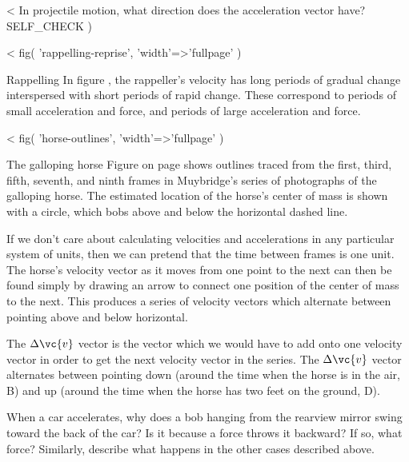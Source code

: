 <%
In projectile motion, what direction does the acceleration vector have?
  SELF_CHECK
  ) %

<%
  fig(
    'rappelling-reprise',
    {
      'width'=>'fullpage'
    }
  )

\begin{eg}{Rappelling}\label{eg:rappelling-reprise}
In figure ,
the rappeller's velocity has long
periods of gradual change interspersed with short periods of
rapid change. These correspond to periods of small
acceleration and force, and periods of large acceleration and force.
\end{eg}

<%
  fig(
    'horse-outlines',
    {
      'width'=>'fullpage'
    }
  )

\begin{eg}{The galloping horse}\label{eg:horse-outlines}
Figure  on page \pageref{fig:horse-outlines}
shows outlines traced from the first, third,
fifth, seventh, and ninth frames in Muybridge's series of
photographs of the galloping horse. The estimated location
of the horse's center of mass is shown with a circle, which
bobs above and below the horizontal dashed line.

   If we don't care about calculating velocities and
accelerations in any particular system of units, then we can
pretend that the time between frames is one unit. The
horse's velocity vector as it moves from one point to the
next can then be found simply by drawing an arrow to connect
one position of the center of mass to the next. This
produces a series of velocity vectors which alternate
between pointing above and below horizontal.

   The $\Delta\vc{v}$ vector is the vector which we would have
to add onto one velocity vector in order to get the next
velocity vector in the series. The $\Delta\vc{v}$ vector
alternates between pointing down (around the time when the
horse is in the air, B) and up (around the time when the
horse has two feet on the ground, D).
\end{eg}

\startdqs

\begin{dq}
When a car accelerates, why does a bob hanging from the
rearview mirror swing toward the back of the car? Is it
because a force throws it backward? If so, what force?
Similarly, describe what happens in the other cases described above.
\end{dq}

